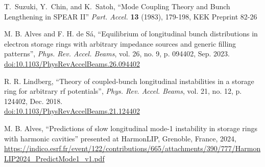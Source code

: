 \documentclass[a4paper,
               ]{jacow}
\begin{document}
{\begin{thebibliography}{9}
    T.~Suzuki, Y.~Chin, and K.~Satoh,
    ``Mode Coupling Theory and Bunch Lengthening in {SPEAR} {II}''
    \emph{Part. Accel.} \textbf{13} (1983), 179-198,
    KEK Preprint 82-26

	M. B. Alves and F. H. de Sá, \textquotedblleft{Equilibrium of longitudinal bunch distributions in electron storage rings with arbitrary impedance sources and generic filling patterns}\textquotedblright, \textit{Phys. Rev. Accel. Beams}, vol. 26, no. 9, p. 094402, Sep. 2023.\\ \url{doi:10.1103/PhysRevAccelBeams.26.094402}

	R. R. Lindberg, \textquotedblleft{Theory of coupled-bunch longitudinal instabilities in a storage ring for arbitrary rf potentials}\textquotedblright, \textit{Phys. Rev. Accel. Beams}, vol. 21, no. 12, p. 124402, Dec. 2018.\\ \url{doi:10.1103/PhysRevAccelBeams.21.124402}

    M. B. Alves,
    ``Predictions of slow longitudinal mode-1 instability in storage rings with harmonic cavities''
    presented at HarmonLIP, Grenoble, France, 2024,
    \url{https://indico.esrf.fr/event/122/contributions/665/attachments/390/777/HarmonLIP2024_PredictMode1_v1.pdf}
	\end{thebibliography}
} %
\end{document}
